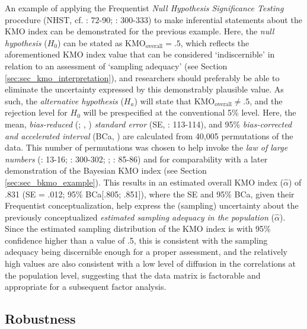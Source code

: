 \documentclass[
  10pt,
  a4paper,
  twoside]{article}
\begin{document}
An example of applying the Frequentist \emph{Null Hypothesis Significance Testing} procedure (NHST, cf. : 72-90; : 300-333) to make inferential statements about the KMO index can be demonstrated for the previous example. Here, the \emph{null hypothesis} (\(H_0\)) can be stated as \(\text{KMO}_{\text{overall}} = .5\), which reflects the aforementioned KMO index value that can be considered `indiscernible' in relation to an assessment of `sampling adequacy' (see Section \ref{sec:sec_kmo_interpretation}), and researchers should preferably be able to eliminate the uncertainty expressed by this demonstrably plausible value. As such, the \emph{alternative hypothesis} (\(H_a\)) will state that \(\text{KMO}_{\text{overall}} \neq .5\), and the rejection level for \(H_0\) will be prespecified at the conventional 5\% level. Here, the mean, \emph{bias-reduced} (; , ) \emph{standard error} (SE, : 113-114), and 95\% \emph{bias-corrected and accelerated interval} (BCa, ) are calculated from 40,005 permutations of the data. This number of permutations was chosen to help invoke the \emph{law of large numbers} (: 13-16; : 300-302; ; : 85-86) and for comparability with a later demonstration of the Bayesian KMO index (see Section \ref{sec:sec_bkmo_example}). This results in an estimated overall KMO index (\(\hat{\alpha}\)) of .831 (SE = .012; 95\% BCa{[}.805; .851{]}), where the SE and 95\% BCa, given their Frequentist conceptualization, help express the (sampling) uncertainty about the previously conceptualized \emph{estimated sampling adequacy in the population} (\(\hat{\alpha}\)). Since the estimated sampling distribution of the KMO index is with 95\% confidence higher than a value of .5, this is consistent with the sampling adequacy being discernible enough for a proper assessment, and the relatively high values are also consistent with a low level of diffusion in the correlations at the population level, suggesting that the data matrix is factorable and appropriate for a subsequent factor analysis.

\subsection{Robustness}\label{sec:sec_kmo_robustness}
\end{document}
